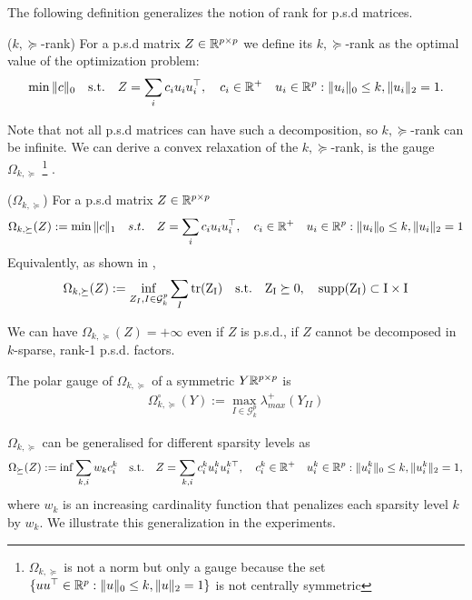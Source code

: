 The following definition generalizes the notion of rank for p.s.d matrices.
\begin{mydef}
($k,\succeq$-rank) For a p.s.d  matrix $Z\in\mathbb{R}^{p\times p}$ we define its $k,\succeq$-rank as the optimal
value of the optimization problem:
\begin{align}
\min \|c\|_0 \quad \text{s.t.} \quad Z=\sum_{i} c_i u_i u_{i}^\top, \quad c_i\in \mathbb{R}^{+} \quad u_{i}\in\mathbb{R}^p  :   \|u_{i}\|_0 \leq k, \|u_{i}\|_2 = 1.
\end{align}
\end{mydef}
Note that not all p.s.d matrices can have such a decomposition, so $k,\succeq$-rank can be infinite. We can derive a convex relaxation of the $k,\succeq$-rank, is the gauge $\Omega_{k,\succeq}$ \footnote{$\Omega_{k,\succeq}$ is not a norm but only a gauge because the set $\{u u^\top \in\mathbb{R}^p  :   \|u\|_0 \leq k, \|u\|_2 = 1\}$  is not centrally symmetric} . 
\begin{mydef}
($\Omega_{k,\succeq}$) For a p.s.d  matrix $Z\in\mathbb{R}^{p\times p}$ 
\begin{align}
\Omega_{k,\succeq}(Z):=\min \|c\|_1 \quad s.t. \quad Z=\sum_{i} c_i u_i u_{i}^\top, \quad c_i\in \mathbb{R}^{+} \quad u_{i}\in\mathbb{R}^p  :   \|u_{i}\|_0 \leq k, \|u_{i}\|_2 = 1
\end{align}
Equivalently, as shown in \citet{richard2014tight}, 
\begin{align}
\Omega_{k,\succeq}(Z):=\inf_{Z_I, I\in\mathcal{G}^p_k} \sum_{I}\rm tr(Z_I) \quad \text{s.t.} \quad Z_I\succeq 0 ,\quad\text{supp}(Z_I)\subset I\times I
\end{align}
\end{mydef}

We can have $\Omega_{k,\succeq}(Z)=+\infty$ even if $Z$ is p.s.d., if $Z$ cannot be decomposed in $k$-sparse,  rank-1 p.s.d. factors.

\begin{lemm} The polar gauge of $\Omega_{k,\succeq}$ of a symmetric $Y\mathbb{R}^{p\times p}$ is
\begin{align}
\Omega_{k,\succeq}^{\circ}(Y):= \max_{I\in\mathcal{G}^p_k}\lambda^{+}_{max}(Y_{II})
\end{align}
\end{lemm}

$\Omega_{k,\succeq}$ can be generalised for different sparsity levels as
\begin{align}
\Omega_{\succeq}(Z):=\inf \sum_{k,i}w_{k}c_i^k \quad \text{s.t.} \quad Z=\sum_{k,i} c_i^k u_i^k u_{i}^{k\top}, \quad c_i^k\in \mathbb{R}^{+} \quad u_{i}^k\in\mathbb{R}^p  :   \|u_{i}^k\|_0 \leq k, \|u_{i}^k\|_2 = 1,
\end{align}
where $w_{k}$ is an increasing cardinality function that penalizes each sparsity level $k$ by $w_{k}$. We illustrate this generalization in the experiments.

